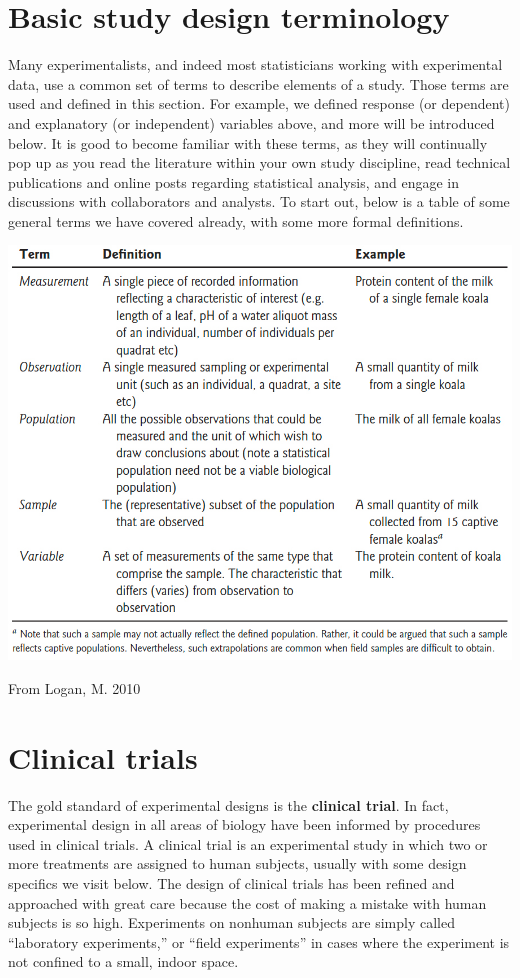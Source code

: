 \documentclass[]{book}
\begin{document}
\hypertarget{basic-study-design-terminology}{%
\section{Basic study design terminology}\label{basic-study-design-terminology}}

Many experimentalists, and indeed most statisticians working with experimental data, use a common set of terms to describe elements of a study. Those terms are used and defined in this section. For example, we defined response (or dependent) and explanatory (or independent) variables above, and more will be introduced below. It is good to become familiar with these terms, as they will continually pop up as you read the literature within your own study discipline, read technical publications and online posts regarding statistical analysis, and engage in discussions with collaborators and analysts. To start out, below is a table of some general terms we have covered already, with some more formal definitions.

\includegraphics[width=12.4in]{images/Logan_ExpTerms}

From Logan, M. 2010

\hypertarget{clinical-trials}{%
\section{Clinical trials}\label{clinical-trials}}

The gold standard of experimental designs is the \textbf{clinical trial}. In fact, experimental design in all areas of biology have been informed by procedures used in clinical trials. A clinical trial is an experimental study in which two or more treatments are assigned to human subjects, usually with some design specifics we visit below. The design of clinical trials has been refined and approached with great care because the cost of making a mistake with human subjects is so high. Experiments on nonhuman subjects are simply called ``laboratory experiments,'' or ``field experiments'' in cases where the experiment is not confined to a small, indoor space.
\end{document}
